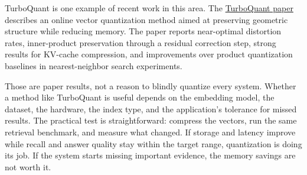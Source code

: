 \documentclass[12pt]{article}
\begin{document}
TurboQuant is one example of recent work in this area. The
\href{https://arxiv.org/abs/2504.19874}{TurboQuant paper} describes an
online vector quantization method aimed at preserving geometric structure
while reducing memory. The paper reports near-optimal distortion rates,
inner-product preservation through a residual correction step, strong
results for KV-cache compression, and improvements over product
quantization baselines in nearest-neighbor search experiments.

Those are paper results, not a reason to blindly quantize every system.
Whether a method like TurboQuant is useful depends on the embedding model,
the dataset, the hardware, the index type, and the application's tolerance
for missed results. The practical test is straightforward: compress the
vectors, run the same retrieval benchmark, and measure what changed. If
storage and latency improve while recall and answer quality stay within
the target range, quantization is doing its job. If the system starts
missing important evidence, the memory savings are not worth it.
\end{document}
